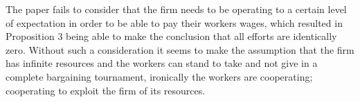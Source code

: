 \documentclass[a4paper,10pt]{article}
\theoremstyle{definition}
\begin{document}
The paper fails to consider that the firm needs to be operating to a certain level of expectation in order to be able to pay their workers wages, which resulted in Proposition 3 being able to make the conclusion that all efforts are identically zero. Without such a consideration it seems to make the assumption that the firm has infinite resources and the workers can stand to take and not give in a complete bargaining tournament, ironically the workers are cooperating; cooperating to exploit the firm of its resources.

%
%
%
%
%
%
\end{document}
